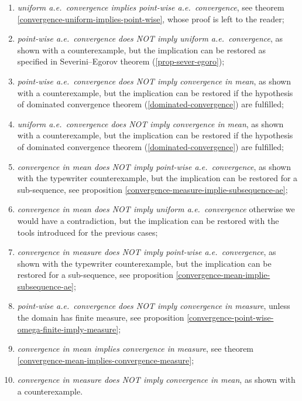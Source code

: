 \begin{enumerate}
	\item \emph{uniform a.e.\ convergence implies point-wise a.e.\ convergence}, see theorem \vref{convergence-uniform-implies-point-wise}, whose proof is left to the reader;
	\item \emph{point-wise a.e.\ convergence does NOT imply uniform a.e.\ convergence}, as shown with a counterexample, but the implication can be restored as specified in Severini--Egorov theorem (\vref{prop-sever-egoro});
	\item \emph{point-wise a.e.\ convergence does NOT imply convergence in mean}, as shown with a counterexample, but the implication can be restored if the hypothesis of dominated convergence theorem (\vref{dominated-convergence}) are fulfilled;
	\item \emph{uniform a.e.\ convergence does NOT imply convergence in mean}, as shown with a counterexample, but the implication can be restored if the hypothesis of dominated convergence theorem (\vref{dominated-convergence}) are fulfilled;
	\item \emph{convergence in mean does NOT imply point-wise a.e.\ convergence}, as shown with the typewriter counterexample, but the implication can be restored for a sub-sequence, see proposition \vref{convergence-measure-implie-subsequence-ae};
	\item \emph{convergence in mean does NOT imply uniform a.e.\ convergence} otherwise we would have a contradiction, but the implication can be restored with the tools introduced for the previous cases;
	\item \emph{convergence in measure does NOT imply point-wise a.e.\ convergence}, as shown with the typewriter counterexample, but the implication can be restored for a sub-sequence, see proposition \vref{convergence-mean-implie-subsequence-ae};
	\item \emph{point-wise a.e.\ convergence does NOT imply convergence in measure}, unless the domain has finite measure, see proposition \vref{convergence-point-wise-omega-finite-imply-measure};
	\item \emph{convergence in mean implies convergence in measure}, see theorem \vref{convergence-mean-implies-convergence-measure};
	\item \emph{convergence in measure does NOT imply convergence in mean}, as shown with a counterexample.
\end{enumerate}


